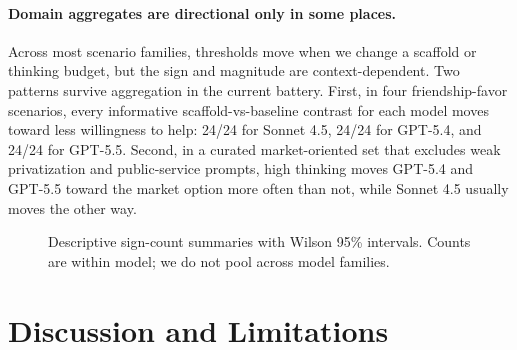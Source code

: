 \documentclass[10pt]{article}
\begin{document}
\paragraph{Domain aggregates are directional only in some places.}
Across most scenario families, thresholds move when we change a scaffold or thinking budget, but the sign and magnitude are context-dependent. Two patterns survive aggregation in the current battery. First, in four friendship-favor scenarios, every informative scaffold-vs-baseline contrast for each model moves toward less willingness to help: 24/24 for Sonnet 4.5, 24/24 for GPT-5.4, and 24/24 for GPT-5.5. Second, in a curated market-oriented set that excludes weak privatization and public-service prompts, high thinking moves GPT-5.4 and GPT-5.5 toward the market option more often than not, while Sonnet 4.5 usually moves the other way.

\begin{figure}[t]
\centering
{}
\caption{Descriptive sign-count summaries with Wilson 95\% intervals. Counts are within model; we do not pool across model families.}
\label{fig:signcounts}
\end{figure}

\section{Discussion and Limitations}
\end{document}

